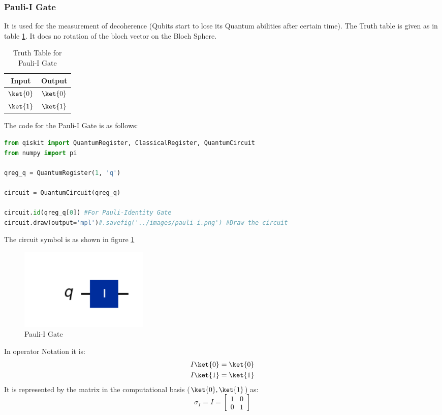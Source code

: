 \documentclass[12pt, oneside]{book}
\theoremstyle{definition}
\theoremstyle{definition}
\theoremstyle{remark}
\begin{document}
\subsubsection{Pauli-I Gate}
It is used for the measurement of decoherence (Qubits start to lose its Quantum abilities after certain time).
The Truth table is given as in table \ref{tab:pauli-i}. It does no rotation of the bloch vector on the Bloch Sphere.
\begin{table}[H]
    \centering
    \begin{tabular}{|c|c|}
        \hline
        Input & Output\\
        \hline  
        $\ket{0}$ & $\ket{0}$\\
        $\ket{1}$ & $\ket{1}$\\
        \hline
    \end{tabular}
    \caption{Truth Table for Pauli-I Gate}
    \label{tab:pauli-i}
\end{table}
The code for the Pauli-I Gate is as follows:
\begin{lstlisting}[language=Python]
from qiskit import QuantumRegister, ClassicalRegister, QuantumCircuit
from numpy import pi

qreg_q = QuantumRegister(1, 'q')

circuit = QuantumCircuit(qreg_q)

circuit.id(qreg_q[0]) #For Pauli-Identity Gate
circuit.draw(output='mpl')#.savefig('../images/pauli-i.png') #Draw the circuit
\end{lstlisting}
The circuit symbol is as shown in figure \ref{fig:pauli-i}
\begin{figure}[H]
    \centering
    \includegraphics[width=0.3\textwidth]{../images/pauli-i.png}
    \caption{Pauli-I Gate}
    \label{fig:pauli-i}
\end{figure}
In operator Notation it is:
\begin{align*}
    I\ket{0}&=\ket{0} \\
    I\ket{1}&=\ket{1}
\end{align*}
It is represented by the matrix in the computational basis ($\ket{0},\ket{1}$) as:
\[
    \sigma_I=I=\begin{bmatrix}
        1 & 0 \\
        0 & 1
    \end{bmatrix}
\]
\end{document}

